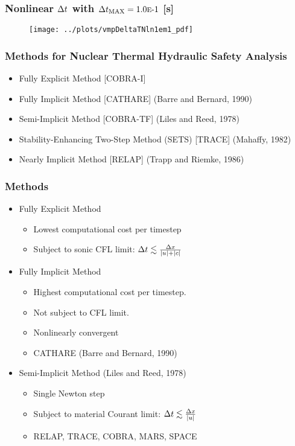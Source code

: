 \documentclass[compress,xcolor=table]{beamer}
\begin{document}
\begin{frame} 
\frametitle{Nonlinear $\dt{}$ with $\dtmax{} = \expneg{1.0}{1}$ [s]}

\begin{figure}[h!t]
\centering
\texttt{[image: ../plots/vmpDeltaTNln1em1\_pdf]}
\end{figure}



\end{frame}
\begin{frame} 
\frametitle{Methods for Nuclear Thermal Hydraulic Safety Analysis}

\begin{itemize}
\item{Fully Explicit Method [COBRA-I]}
\item{Fully Implicit Method [CATHARE] (Barre and Bernard, 1990)}
\item{Semi-Implicit Method [COBRA-TF] (Liles and Reed, 1978) }
\item{Stability-Enhancing Two-Step Method (SETS) [TRACE] (Mahaffy, 1982) }
\item{Nearly Implicit Method [RELAP] (Trapp and Riemke, 1986) }
\end{itemize}

\end{frame}
\begin{frame} 
\frametitle{Methods}
\begin{itemize}
\item{Fully Explicit Method
\begin{itemize}
\item{Lowest computational cost per timestep}
\item{Subject to sonic CFL limit: $ \dt{} \lesssim \frac{\dx{}}{|u|+|c|}$}
\end{itemize}
}
\item{Fully Implicit Method
\begin{itemize}
\item{Highest computational cost per timestep.}
\item{Not subject to CFL limit.}
\item{Nonlinearly convergent}
\item{CATHARE (Barre and Bernard, 1990)}
\end{itemize}
}
\item{Semi-Implicit Method (Liles and Reed, 1978)
\begin{itemize}
\item{Single Newton step}
\item{Subject to material Courant limit: $ \dt{} \lesssim \frac{\dx{}}{|u|}$}
\item{RELAP, TRACE, COBRA, MARS, SPACE} 
\end{itemize}
}
\end{itemize}
\end{frame}
\end{document}
